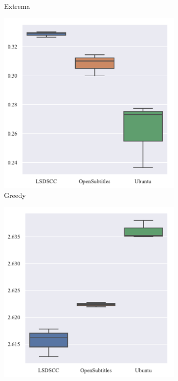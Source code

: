 \begin{figure}[H]
\begin{subfigure}{0.24\linewidth}
        \centering
        \caption{Extrema}
    \end{subfigure}
    \begin{subfigure}{0.24\linewidth}
        \includegraphics[width=\linewidth]{figure/boxplot/dataset/embedding_based_greedy_matching/plot.pdf}
        \centering
        \caption{Greedy}
    \end{subfigure}%
    \begin{subfigure}{0.24\linewidth}
        \includegraphics[width=\linewidth]{figure/boxplot/dataset/adem/plot.pdf}

\end{subfigure}
\end{figure}
